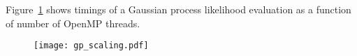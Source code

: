 Figure~\ref{fig:gp} shows timings of a Gaussian process likelihood evaluation
as a function of number of OpenMP threads. 

%
%
%
\begin{figure}
  \texttt{[image: gp\_scaling.pdf]}
  \label{fig:gp}
\end{figure}
